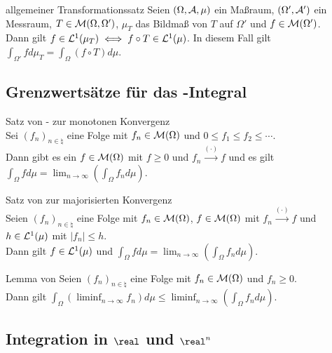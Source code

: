 \begin{Satz}{allgemeiner Transformationssatz}
    Seien $(\Omega, \mathcal{A}, \mu)$ ein Maßraum, $(\Omega', \mathcal{A}')$ ein Messraum,
    $T \in \mathcal{M}(\Omega, \Omega')$, $\mu_T$ das Bildmaß von $T$ auf $\Omega'$ und
    $f \in \mathcal{M}(\Omega')$.\\
    Dann gilt $f \in \mathcal{L}^1(\mu_T) \iff f \circ T \in \mathcal{L}^1(\mu)$.
    In diesem Fall gilt $\int_{\Omega'} f d\mu_T = \int_\Omega (f \circ T) d\mu$.
\end{Satz}

\subsection{%
    Grenzwertsätze für das -Integral%
}

\begin{Satz}{Satz von - zur monotonen Konvergenz}\\
    Sei $(f_n)_{n \in \natural}$ eine Folge mit $f_n \in \mathcal{M}(\Omega)$ und
    $0 \le f_1 \le f_2 \le \dotsb$.\\
    Dann gibt es ein $f \in \mathcal{M}(\Omega)$ mit $f \ge 0$ und $f_n \xrightarrow{(\cdot)} f$
    und es gilt $\int_\Omega f d\mu = \lim_{n \to \infty} \left(\int_\Omega f_n d\mu\right)$.
\end{Satz}

\begin{Satz}{Satz von  zur majorisierten Konvergenz}\\
    Seien $(f_n)_{n \in \natural}$ eine Folge mit $f_n \in \mathcal{M}(\Omega)$,
    $f \in \mathcal{M}(\Omega)$ mit $f_n \xrightarrow{(\cdot)} f$ und
    $h \in \mathcal{L}^1(\mu)$ mit $|f_n| \le h$.\\
    Dann gilt $f \in \mathcal{L}^1(\mu)$ und
    $\int_\Omega f d\mu = \lim_{n \to \infty} \left(\int_\Omega f_n d\mu\right)$.
\end{Satz}

\begin{Lemma}{Lemma von }
    Seien $(f_n)_{n \in \natural}$ eine Folge mit $f_n \in \mathcal{M}(\Omega)$ und $f_n \ge 0$.\\
    Dann gilt $\int_\Omega (\liminf_{n \to \infty} f_n) d\mu \le
    \liminf_{n \to \infty} \left(\int_\Omega f_n d\mu\right)$.
\end{Lemma}

\pagebreak

\subsection{%
    Integration in \texorpdfstring{$\real$}{ℝ} und \texorpdfstring{$\real^n$}{ℝⁿ}%
}

